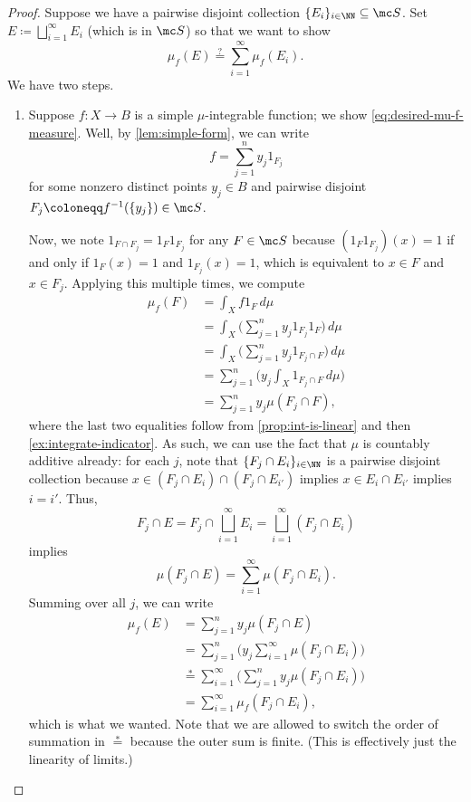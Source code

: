 \documentclass[../notes.tex]{subfiles}
\begin{document}
\begin{proof}
	Suppose we have a pairwise disjoint collection $\{E_i\}_{i\in\NN}\subseteq\mc S$. Set $E\coloneqq\bigsqcup_{i=1}^\infty E_i$ (which is in $\mc S$) so that we want to show
	\begin{equation}
		\mu_f(E)\stackrel?=\sum_{i=1}^\infty\mu_f(E_i). \label{eq:desired-mu-f-measure}
	\end{equation}
	We have two steps.
	\begin{enumerate}
		\item Suppose $f\colon X\to B$ is a simple $\mu$-integrable function; we show \autoref{eq:desired-mu-f-measure}. Well, by \autoref{lem:simple-form}, we can write
		\[f=\sum_{j=1}^ny_j1_{F_j}\]
		for some nonzero distinct points $y_j\in B$ and pairwise disjoint $F_j\coloneqq f^{-1}(\{y_j\})\in\mc S$.

		Now, we note $1_{F\cap F_j}=1_F1_{F_j}$ for any $F\in\mc S$ because $(1_F1_{F_j})(x)=1$ if and only if $1_F(x)=1$ and $1_{F_j}(x)=1$, which is equivalent to $x\in F$ and $x\in F_j$. Applying this multiple times, we compute
		\begin{align*}
			\mu_f(F) &= \int_Xf1_F\,d\mu \\
			&= \int_X\Bigg(\sum_{j=1}^ny_j1_{F_j}1_F\Bigg)\,d\mu \\
			&= \int_X\Bigg(\sum_{j=1}^ny_j1_{F_j\cap F}\Bigg)\,d\mu \\
			&= \sum_{j=1}^n\Bigg(y_j\int_X1_{F_j\cap F}\,d\mu\Bigg) \\
			&= \sum_{j=1}^ny_j\mu(F_j\cap F),
		\end{align*}
		where the last two equalities follow from \autoref{prop:int-is-linear} and then \autoref{ex:integrate-indicator}. As such, we can use the fact that $\mu$ is countably additive already: for each $j$, note that $\{F_j\cap E_i\}_{i\in\NN}$ is a pairwise disjoint collection because $x\in (F_j\cap E_i)\cap(F_j\cap E_{i'})$ implies $x\in E_i\cap E_{i'}$ implies $i=i'$. Thus,
		\[F_j\cap E=F_j\cap\bigsqcup_{i=1}^\infty E_i=\bigsqcup_{i=1}^\infty(F_j\cap E_i)\]
		implies
		\[\mu(F_j\cap E)=\sum_{i=1}^\infty\mu(F_j\cap E_i).\]
		Summing over all $j$, we can write
		\begin{align*}
			\mu_f(E) &= \sum_{j=1}^ny_j\mu(F_j\cap E) \\
			&= \sum_{j=1}^n\Bigg(y_j\sum_{i=1}^\infty\mu(F_j\cap E_i)\Bigg) \\
			&\stackrel*= \sum_{i=1}^\infty\Bigg(\sum_{j=1}^ny_j\mu(F_j\cap E_i)\Bigg) \\
			&= \sum_{i=1}^\infty\mu_f(F_j\cap E_i),
		\end{align*}
		which is what we wanted. Note that we are allowed to switch the order of summation in $\stackrel*=$ because the outer sum is finite. (This is effectively just the linearity of limits.)


\end{enumerate}
\end{proof}
\end{document}
